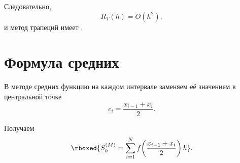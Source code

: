 \documentclass[../final.tex]{subfiles}
\begin{document}
Следовательно,
%
\begin{equation*}
    R_T(h)=O(h^2),
\end{equation*}
%
и метод трапеций имеет .


\section{Формула средних}

В методе средних функцию на каждом интервале заменяем её значением
в центральной точке
%
\begin{equation*}
    c_i=\frac{x_{i-1}+x_i}{2}.
\end{equation*}

Получаем
%
\begin{equation*}
    \rboxed{
    S_h^{(M)}
    =
    \sum_{i=1}^{N}
    f\!\left(\frac{x_{i-1}+x_i}{2}\right)h
    }.
\end{equation*}
\end{document}
